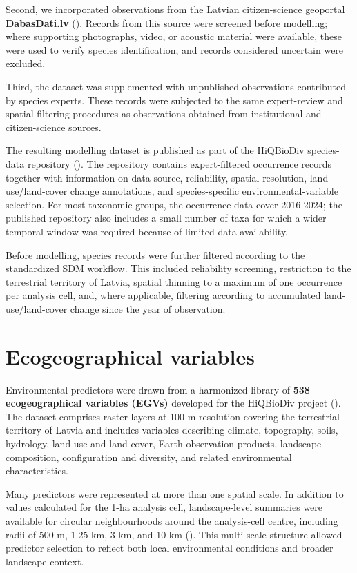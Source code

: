 \documentclass[
  openany]{book}
\begin{document}
Second, we incorporated observations from the Latvian citizen-science geoportal \textbf{DabasDati.lv} (). Records from this source were screened before modelling; where supporting photographs, video, or acoustic material were available, these were used to verify species identification, and records considered uncertain were excluded.

Third, the dataset was supplemented with unpublished observations contributed by species experts. These records were subjected to the same expert-review and spatial-filtering procedures as observations obtained from institutional and citizen-science sources.

The resulting modelling dataset is published as part of the HiQBioDiv species-data repository (). The repository contains expert-filtered occurrence records together with information on data source, reliability, spatial resolution, land-use/land-cover change annotations, and species-specific environmental-variable selection. For most taxonomic groups, the occurrence data cover 2016-2024; the published repository also includes a small number of taxa for which a wider temporal window was required because of limited data availability.

Before modelling, species records were further filtered according to the standardized SDM workflow. This included reliability screening, restriction to the terrestrial territory of Latvia, spatial thinning to a maximum of one occurrence per analysis cell, and, where applicable, filtering according to accumulated land-use/land-cover change since the year of observation.

\section{Ecogeographical variables}\label{egvs}

Environmental predictors were drawn from a harmonized library of \textbf{538 ecogeographical variables (EGVs)} developed for the HiQBioDiv project (). The dataset comprises raster layers at 100 m resolution covering the terrestrial territory of Latvia and includes variables describing climate, topography, soils, hydrology, land use and land cover, Earth-observation products, landscape composition, configuration and diversity, and related environmental characteristics.

Many predictors were represented at more than one spatial scale. In addition to values calculated for the 1-ha analysis cell, landscape-level summaries were available for circular neighbourhoods around the analysis-cell centre, including radii of 500 m, 1.25 km, 3 km, and 10 km (). This multi-scale structure allowed predictor selection to reflect both local environmental conditions and broader landscape context.
\end{document}
